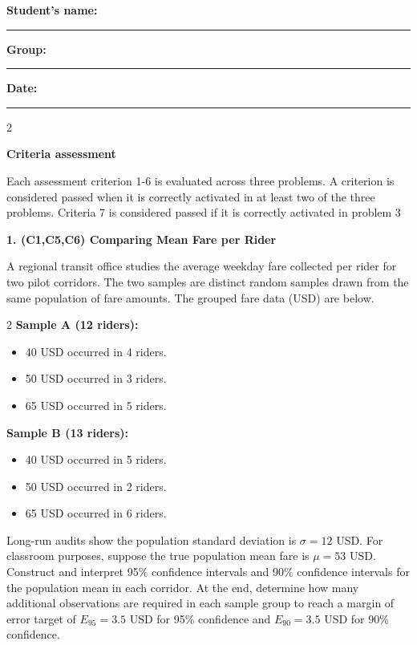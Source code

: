 \documentclass[12pt]{article}
\newcommand{\SubsectionBox}[1]{%
	\noindent\colorbox{gray!30}{%
		\parbox{\linewidth}{\textbf{#1}}%
	}\par\vspace{0.35cm}%
}
\begin{document}
	\vspace{0.4cm}

	\noindent
	\textbf{Student's name:} \rule{7cm}{0.4pt}\hfill
	\textbf{Group:} \rule{2cm}{0.4pt}\hfill
	\textbf{Date:} \rule{3cm}{0.4pt}

	\begin{multicols}{2}
		\SubsectionBox{Criteria assessment}\vspace{-0.25cm}
		Each assessment criterion 1-6 is evaluated across three problems. A criterion is considered passed when it is correctly activated in at least two of the three problems. Criteria 7 is considered passed if it is correctly activated in problem 3

		\vspace{0.25cm}
		\SubsectionBox{1. (C1,C5,C6) Comparing Mean Fare per Rider}\vspace{-0.25cm}
		A regional transit office studies the average weekday fare collected per rider for two pilot corridors.
		The two samples are distinct random samples drawn from the same population of fare amounts.
		The grouped fare data (USD) are below.

		\begin{multicols}{2}
			\textbf{Sample A (12 riders):}
			\begin{itemize}
				\item 40 USD occurred in 4 riders.
				\item 50 USD occurred in 3 riders.
				\item 65 USD occurred in 5 riders.
			\end{itemize}

			\columnbreak

			\textbf{Sample B (13 riders):}
			\begin{itemize}
				\item 40 USD occurred in 5 riders.
				\item 50 USD occurred in 2 riders.
				\item 65 USD occurred in 6 riders.
			\end{itemize}
		\end{multicols}

		Long-run audits show the population standard deviation is $\sigma = 12$ USD.
		For classroom purposes, suppose the true population mean fare is $\mu = 53$ USD.
		Construct and interpret 95\% confidence intervals and 90\% confidence intervals for the population mean in each corridor.
		At the end, determine how many additional observations are required in each sample group to reach a margin of error target of $E_{95} = 3.5$ USD for 95\% confidence and $E_{90} = 3.5$ USD for 90\% confidence.


\end{multicols}
\end{document}
